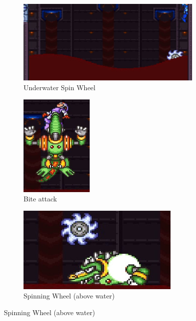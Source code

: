 \begin{figure}[htp]
	\centering
	\begin{subfigure}{\linewidth}
		\centering
		\includegraphics[width=0.9\linewidth]{figures/X2/Wheel_gator/Gator_Spinning_wheel.png}
		\caption{Underwater Spin Wheel}
	\end{subfigure}
	\begin{subfigure}{0.45\linewidth}
		\centering
		\includegraphics[height=5cm]{figures/X2/Wheel_gator/Gator_bite.png}
		\caption{Bite attack}
	\end{subfigure}
	\begin{subfigure}{0.45\linewidth}
		\centering
		\includegraphics[width=\linewidth]{figures/X2/Wheel_gator/Gator_spinning_wheel_2.png}
		\caption{Spinning Wheel (above water)}
	\end{subfigure}
\end{figure}
